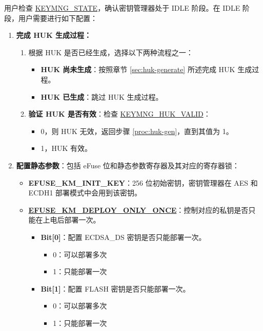 \documentclass[main\_\_CN.tex]{subfiles}
\begin{document}
用户检查 \hyperref[fielddesc:KEYMNGSTATE]{KEYMNG\_STATE}，确认密钥管理器处于 IDLE 阶段。在 IDLE 阶段，用户需要进行如下配置：
\begin{enumerate}
    \item \textbf{完成 HUK 生成过程：}
    \begin{enumerate}
        \item 根据 HUK 是否已经生成，选择以下两种流程之一：
        \label{proc:huk-gen}
        \begin{itemize}
            \item \textbf{HUK 尚未生成}：按照章节 \ref{sec:huk-generate} 所述完成 HUK 生成过程。
            \item \textbf{HUK 已生成}：跳过 HUK 生成过程。
        \end{itemize}
        \item \textbf{验证 HUK 是否有效}：检查 \hyperref[fielddesc:KEYMNGHUKVALID]{KEYMNG\_HUK\_VALID}：
        \begin{itemize}
            \item 0，则 HUK 无效，返回步骤 \ref{proc:huk-gen}，直到其值为 1。
            \item 1，HUK 有效。
        \end{itemize}
    \end{enumerate}
    \item \textbf{配置静态参数}：包括 eFuse 位和静态参数寄存器及其对应的寄存器锁：
    \begin{itemize}
        \item \textbf{EFUSE\_KM\_INIT\_KEY}：256 位初始密钥，密钥管理器在 AES 和 ECDH1 部署模式中会用到该密钥。
        \item \textbf{\hyperref[fielddesc:EFUSEKMDEPLOYONLYONCE]{EFUSE\_KM\_DEPLOY\_ONLY\_ONCE}}：控制对应的私钥是否只能在上电后部署一次。
        \begin{itemize}
            \item \textbf{Bit[0]}：配置 ECDSA\_DS 密钥是否只能部署一次。
            \begin{itemize}
                \item 0：可以部署多次
                \item 1：只能部署一次
            \end{itemize}
            \item \textbf{Bit[1]}：配置 FLASH 密钥是否只能部署一次。
            \begin{itemize}
                \item 0：可以部署多次
                \item 1：只能部署一次

\end{itemize}
\end{itemize}
\end{itemize}
\end{enumerate}
\end{document}
